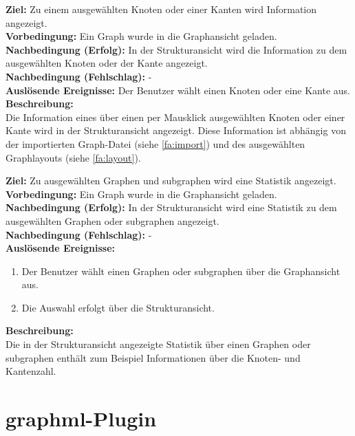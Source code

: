 \label{fa:infoanzeige}
\textbf{Ziel:} Zu einem ausgewählten Knoten oder einer Kanten wird Information angezeigt.\\
\textbf{Vorbedingung:} Ein Graph wurde in die Graphansicht geladen.\\
\textbf{Nachbedingung (Erfolg):} In der Strukturansicht wird die Information zu dem ausgewählten Knoten oder der Kante angezeigt.\\
\textbf{Nachbedingung (Fehlschlag):} -\\
\textbf{Auslösende Ereignisse:} Der Benutzer wählt einen Knoten oder eine Kante aus.\\
\textbf{Beschreibung:}\\
Die Information eines über einen per Mausklick ausgewählten Knoten oder einer Kante wird in der Strukturansicht angezeigt. Diese Information ist abhängig von der importierten Graph-Datei (siehe \ref{fa:import}) und des ausgewählten Graphlayouts (siehe \ref{fa:layout}).

\label{fa:statistik}
\textbf{Ziel:} Zu ausgewählten Graphen und \gls{subgraph}en wird eine Statistik angezeigt.\\
\textbf{Vorbedingung:} Ein Graph wurde in die Graphansicht geladen.\\
\textbf{Nachbedingung (Erfolg):} In der Strukturansicht wird eine Statistik zu dem ausgewählten Graphen oder \gls{subgraph}en angezeigt.\\
\textbf{Nachbedingung (Fehlschlag):} -\\
\textbf{Auslösende Ereignisse:}
\begin{enumerate}[nolistsep, label=(\alph*)]
  \item Der Benutzer wählt einen Graphen oder \gls{subgraph}en über die Graphansicht aus.
  \item Die Auswahl erfolgt über die Strukturansicht.
\end{enumerate}
\textbf{Beschreibung:}\\
Die in der Strukturansicht angezeigte Statistik über einen Graphen oder \gls{subgraph}en enthält zum Beispiel Informationen über die Knoten- und Kantenzahl.


\label{fa:speichern}
\label{fa:laden}
\label{fa:laden}

\section{\gls{graphml}-Plugin}
\setcounter{fanr}{300}

